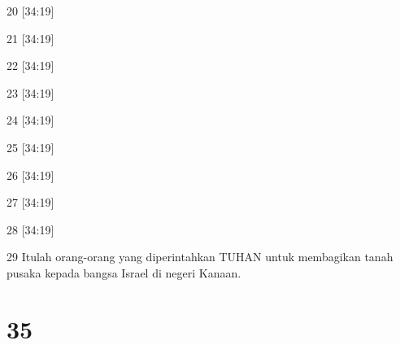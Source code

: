 \par 20 [34:19]
\par 21 [34:19]
\par 22 [34:19]
\par 23 [34:19]
\par 24 [34:19]
\par 25 [34:19]
\par 26 [34:19]
\par 27 [34:19]
\par 28 [34:19]
\par 29 Itulah orang-orang yang diperintahkan TUHAN untuk membagikan tanah pusaka kepada bangsa Israel di negeri Kanaan.

\chapter{35}

